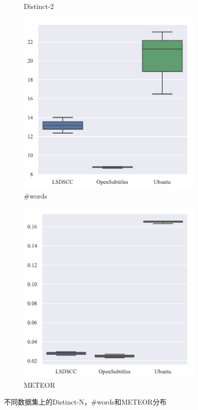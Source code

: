 \begin{figure}[H]
\begin{subfigure}{0.25\linewidth}
        \caption{Distinct-2}
    \end{subfigure}%
    \begin{subfigure}{0.25\linewidth}
        \centering
        \includegraphics[width=\linewidth]{figure/boxplot/dataset/utterance_len/plot.pdf}
        \caption{\#words}
    \end{subfigure}%
    \begin{subfigure}{0.25\linewidth}
        \centering
        \includegraphics[width=\linewidth]{figure/boxplot/dataset/meteor/plot.pdf}
        \caption{METEOR}
    \end{subfigure}
    \caption{不同数据集上的Distinct-N，\#words和METEOR分布}
    \label{fig:Other_dataset}
\end{figure}

